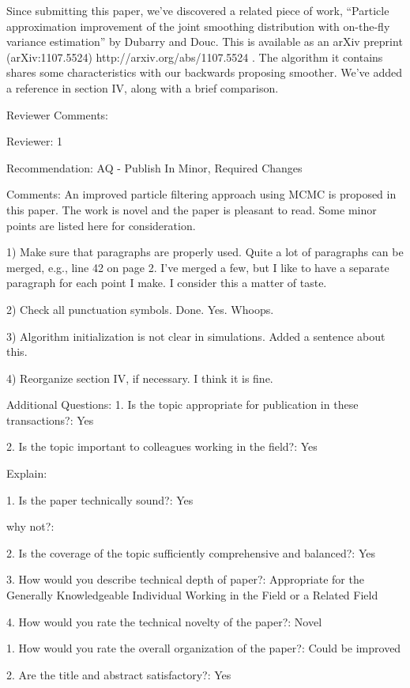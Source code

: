 \documentclass{article}
\begin{document}
{\meta Since submitting this paper, we've discovered a related piece of work, ``Particle approximation improvement of the
joint smoothing distribution with on-the-fly variance estimation'' by Dubarry and Douc. This is available as an arXiv preprint (arXiv:1107.5524) http://arxiv.org/abs/1107.5524 . The algorithm it contains shares some characteristics with our backwards proposing smoother. We've added a reference in section IV, along with a brief comparison.  }

Reviewer Comments:

Reviewer: 1

Recommendation: AQ - Publish In Minor, Required Changes

Comments:
An improved particle filtering approach using MCMC is proposed in this paper. The work is novel and the paper is pleasant to read. Some minor points are listed here for consideration.

1) Make sure that paragraphs are properly used. Quite a lot of paragraphs can be merged, e.g., line 42 on page 2.
{\meta I've merged a few, but I like to have a separate paragraph for each point I make. I consider this a matter of taste. }

2) Check all punctuation symbols.
{\meta Done. Yes. Whoops.}

3) Algorithm initialization is not clear in simulations.
{\meta Added a sentence about this.}

4) Reorganize section IV, if necessary.
{\meta I think it is fine.}

Additional Questions:
1. Is the topic appropriate for publication in these transactions?: Yes

2. Is the topic important to colleagues working in the field?: Yes

Explain:

1. Is the paper technically sound?: Yes

why not?:

2. Is the coverage of the topic sufficiently comprehensive and balanced?: Yes

3. How would you describe technical depth of paper?: Appropriate for the Generally Knowledgeable Individual Working in the Field or a Related Field

4. How would you rate the technical novelty of the paper?: Novel

1. How would you rate the overall organization of the paper?: Could be improved

2. Are the title and abstract satisfactory?: Yes
\end{document}
